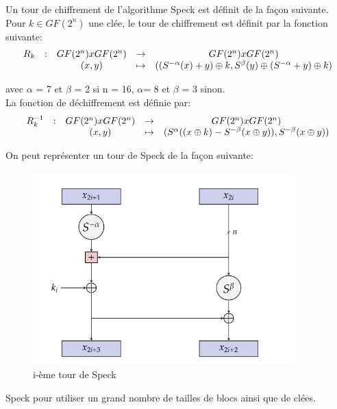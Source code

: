 			Un tour de chiffrement de l'algorithme Speck est définit de la façon suivante. \\
			Pour $k \in GF(2^n)$ une clée, le tour de chiffrement est définit par la fonction suivante:
			\[
			\begin{array}{ccccc}
			R_k & : & GF(2^n) x GF(2^n) & \to & GF(2^n) x GF(2^n) \\
			 & & (x,y) & \mapsto & ((S^{-\alpha}(x) + y) \mathbin{\oplus} k, S^\beta (y) \mathbin{\oplus} (S^{-\alpha} + y) \mathbin{\oplus} k) \\
			\end{array}
			\]

			avec $\alpha$ = 7 et $\beta$ = 2 si n = 16, $\alpha $= 8 et $\beta$ = 3 sinon. \\

			La fonction de déchiffrement est définie par:
			\[
			\begin{array}{ccccc}
			R_k^{-1} & : & GF(2^n) x GF(2^n) & \to & GF(2^n) x GF(2^n) \\
			 & & (x,y) & \mapsto & (S^\alpha ((x \mathbin{\oplus} k) - S^{-\beta}(x \mathbin{\oplus} y)), S^{-\beta}(x \mathbin{\oplus} y)) \\
			\end{array}
			\]

			On peut représenter un tour de Speck de la façon suivante:

			\begin{figure}[!h]
				\centering
				\includegraphics[width=0.9\textwidth]{imgs/roundSpeck.png}
				\caption{i-ème tour de Speck}
			 	\label{roundSpeck}
			\end{figure}

			\vspace{0.3cm}

			Speck pour utiliser un grand nombre de tailles de blocs ainsi que de clées.

